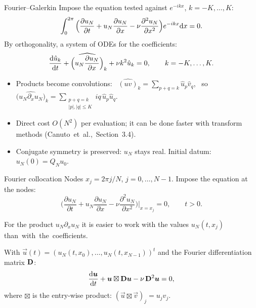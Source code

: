 \begin{frame}{Fourier--Galerkin}
    \small
    Impose the equation tested against $e^{-ikx}$, $k = -K, \dots, K$:
    \[
        \int_0^{2\pi} \Big( \frac{\partial u_N}{\partial t} + u_N \frac{\partial u_N}{\partial x} - \nu \frac{\partial^2 u_N}{\partial x^2} \Big) e^{-ikx} {\mathrm d} x = 0.
    \]
    By orthogonality, a system of ODEs for the coefficients:
    \[
        \frac{{\mathrm d} \hat u_k}{{\mathrm d} t} + \widehat{\Big(u_N \frac{\partial u_N}{\partial x}\Big)}_k + \nu k^2 \hat u_k = 0, \qquad k = -K, \dots, K.
    \]
    \begin{itemize}
        \item Products become \alert{convolutions}: \
              $\widehat{(uv)}_k = \sum_{p + q = k} \hat u_p \hat v_q$, \ so \
              $\widehat{\big(u_N \partial_x u_N\big)}_k = \sum_{\substack{p+q = k\\ |p|,|q| \le K}} iq\, \hat u_p \hat u_q$.
        \item Direct cost $O(N^2)$ per evaluation; it can be done faster with transform methods \mbox{(Canuto et al., Section 3.4).}
        \item Conjugate symmetry is preserved: $u_N$ stays real. Initial datum: $u_N(0) = Q_N u_0$.
    \end{itemize}
\end{frame}

\begin{frame}{Fourier collocation}
    Nodes $x_j = 2\pi j/N$, $j = 0, \dots, N-1$. Impose the equation at the nodes:
    \[
        \Big( \frac{\partial u_N}{\partial t} + u_N \frac{\partial u_N}{\partial x} - \nu \frac{\partial^2 u_N}{\partial x^2} \Big)\Big|_{x = x_j} = 0, \qquad t > 0.
    \]
    \begin{remark}
        For the product $u_N \partial_x u_N$ it is easier to work with the \alert{values} $u_N(t, x_j)$ \mbox{than with the coefficients.}
    \end{remark}
    With $\vec u(t) = (u_N(t,x_0), \dots, u_N(t,x_{N-1}))^t$ and the Fourier differentiation matrix $\mathbf{D}$:
    \[
        \frac{{\mathrm d} \bm{u}}{{\mathrm d} t} + \bm{u} \boxtimes \mathbf{D} \bm{u} - \nu\, \mathbf{D}^2 \bm{u} = 0,
    \]
    where $\boxtimes$ is the entry-wise product: $(\vec u \boxtimes \vec v)_j = u_j v_j$.
\end{frame}

